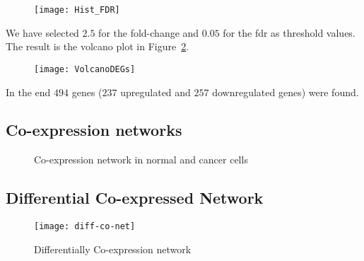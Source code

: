 \documentclass[
10pt, %
a4paper, %
oneside, %
headinclude,footinclude, %
BCOR5mm, %
]{scrartcl}
\begin{document}
\begin{figure}[h!]
\centering 
\texttt{[image: Hist\_FDR]} 
\caption[Histogram of $-\log{(FDR)}$]{} %
\label{fig:2} 
\end{figure}

We have selected $ 2.5 $ for the fold-change and $ 0.05 $ for the fdr as threshold values. The result is the volcano plot in Figure~\ref{fig:3}.

\begin{figure}[h!]
\centering 
\texttt{[image: VolcanoDEGs]} 
\caption[Volcano Plot]{} %
\label{fig:3} 
\end{figure}

In the end $494$ genes ($237$ upregulated and $257$ downregulated genes) were found.


\subsection{Co-expression networks}


\begin{figure}[h!]
\centering
{} \quad
{} 
\caption[Co-expression network in normal and cancer cells]{Co-expression network in normal and cancer cells} %
\label{fig:esempio}
\end{figure}

\newpage

\subsection{Differential Co-expressed Network}

\begin{figure}[h!]
\centering 
\texttt{[image: diff-co-net]} 
\caption[Differentially Co-expression network]{Differentially Co-expression network} %
\label{fig:5} 
\end{figure}
\end{document}
